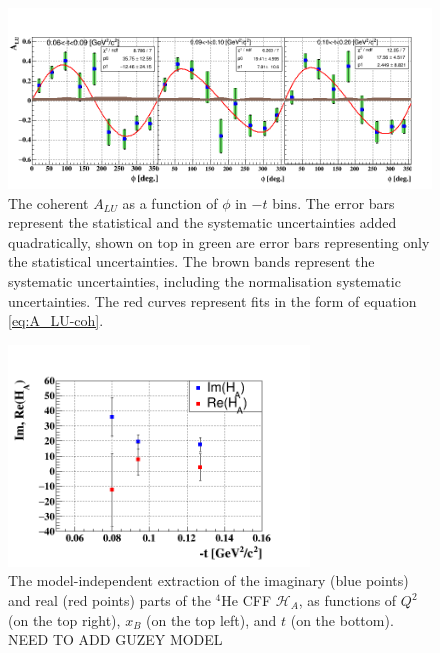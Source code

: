 \documentclass[%
 reprint,
 amsmath,amssymb,
 aps,
]{revtex4-1}
\begin{document}
\begin{figure}[htbp]
\caption{\label{fig:assym} The coherent $A_{LU}$ as a function of $\phi$ in 
$-t$ bins. The error bars 
represent the statistical and the systematic uncertainties added 
quadratically, shown on top in green are error bars representing only the 
statistical uncertainties. The brown bands represent the systematic 
uncertainties, including the normalisation systematic uncertainties. The red 
curves represent fits in the form of equation \ref{eq:A_LU-coh}.}
\includegraphics[width=14cm]{coh_alu_t_phi.png}
\end{figure}


\begin{figure}[htbp]
\caption{\label{fig:CFF} The model-independent extraction of the imaginary (blue points) and 
real (red points) parts of the $^4$He CFF $\mathcal{H}_A$, as functions of 
$Q^{2}$ (on the top right), $x_B$ (on the top left), and $t$ (on the bottom).
NEED TO ADD GUZEY MODEL}
\includegraphics[width=8cm]{HA_t.png}
\end{figure}
\end{document}
